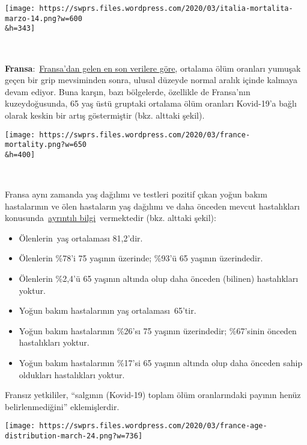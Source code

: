 \texttt{[image: https://swprs.files.wordpress.com/2020/03/italia-mortalita-marzo-14.png?w=600\\\&h=343]}

~

\textbf{Fransa}:~\href{https://www.santepubliquefrance.fr/maladies-et-traumatismes/maladies-et-infections-respiratoires/infection-a-coronavirus/documents/bulletin-national/covid-19-point-epidemiologique-du-24-mars-2020}{Fransa'dan
gelen en son verilere göre}, ortalama ölüm oranları yumuşak geçen bir
grip mevsiminden sonra, ulusal düzeyde normal aralık içinde kalmaya
devam ediyor. Buna karşın, bazı bölgelerde, özellikle de Fransa'nın
kuzeydoğusunda, 65 yaş üstü gruptaki ortalama ölüm oranları Kovid-19'a
bağlı olarak keskin bir artış göstermiştir (bkz. alttaki şekil).~

\texttt{[image: https://swprs.files.wordpress.com/2020/03/france-mortality.png?w=650\\\&h=400]}

~

Fransa aynı zamanda yaş dağılımı ve testleri pozitif çıkan yoğun bakım
hastalarının ve ölen hastaların yaş dağılımı ve daha önceden mevcut
hastalıkları
konusunda~\href{https://www.santepubliquefrance.fr/maladies-et-traumatismes/maladies-et-infections-respiratoires/infection-a-coronavirus/documents/bulletin-national/covid-19-point-epidemiologique-du-24-mars-2020}{ayrıntılı
bilgi}~vermektedir (bkz. alttaki şekil):

\begin{itemize}
\tightlist
\item
  Ölenlerin~yaş ortalaması 81,2'dir.
\item
  Ölenlerin \%78'i 75 yaşının üzerinde; \%93'ü 65 yaşının üzerindedir.
\item
  Ölenlerin \%2,4'ü 65 yaşının altında olup daha önceden (bilinen)
  hastalıkları yoktur.
\item
  Yoğun bakım hastalarının yaş ortalaması~65'tir.
\item
  Yoğun bakım hastalarının \%26'sı 75 yaşının üzerindedir; \%67'sinin
  önceden hastalıkları yoktur.
\item
  Yoğun bakım hastalarının \%17'si 65 yaşının altında olup daha önceden
  sahip oldukları hastalıkları yoktur.
\end{itemize}

 Fransız yetkililer, ``salgının (Kovid-19) toplam ölüm oranlarındaki
payının henüz belirlenmediğini'' eklemişlerdir.

\texttt{[image: https://swprs.files.wordpress.com/2020/03/france-age-distribution-march-24.png?w=736]}

